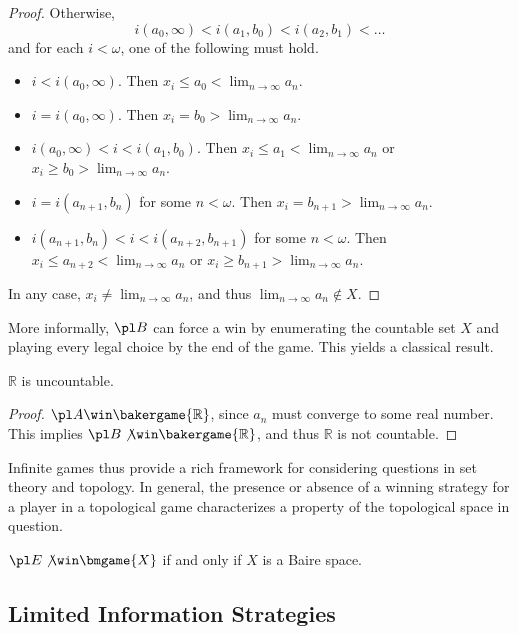 \begin{proof}
  Otherwise,
    \[
      i(a_0,\infty)<i(a_1,b_0)<i(a_2,b_1)<\dots
    \]
  and for each $i<\omega$, one of the following must hold.
    \begin{itemize}
      \item $i<i(a_0,\infty)$. Then $x_i\leq a_0<\lim_{n\to\infty}a_n$.
      \item $i = i(a_0,\infty)$. Then $x_i=b_0>\lim_{n\to\infty}a_n$.
      \item $i(a_0,\infty)<i<i(a_1,b_0)$.
            Then $x_i\leq a_1<\lim_{n\to\infty}a_n$ or
            $x_i\geq b_0>\lim_{n\to\infty}a_n$.
      \item $i = i(a_{n+1},b_n)$ for some $n<\omega$.
            Then $x_i=b_{n+1}>\lim_{n\to\infty}a_n$.
      \item $i(a_{n+1},b_n)<i<i(a_{n+2},b_{n+1})$ for some $n<\omega$.
            Then $x_i\leq a_{n+2}<\lim_{n\to\infty}a_n$ or
            $x_i\geq b_{n+1}>\lim_{n\to\infty}a_n$.
    \end{itemize}
  In any case, $x_i\not=\lim_{n\to\infty}a_n$, and thus
  $\lim_{n\to\infty}a_n\not\in X$.
\end{proof}

More informally, $\pl B$ can force a win by enumerating the countable set
$X$ and playing every legal choice by the end of the game.
This yields a classical result.

\begin{cor}
  $\mathbb{R}$ is uncountable.
\end{cor}

\begin{proof}
  $\pl A\win \bakergame{\mathbb{R}}$, since $a_n$ must converge to some
  real number. This implies $\pl B\not\win \bakergame{\mathbb{R}}$, and thus
  $\mathbb{R}$ is not countable.
\end{proof}

Infinite games thus provide a rich framework for considering questions in
set theory and topology. In general, the presence or absence of a winning
strategy for a player in a topological game characterizes a property of the
topological space in question.

\begin{thm}
$\pl E\not\win \bmgame{X}$ if and only if $X$ is a Baire space.
\cite{MR0431104}
\end{thm}

\subsection{Limited Information Strategies}

